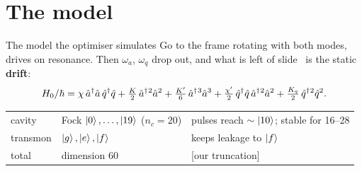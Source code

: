 \section{The model}

\begin{frame}{The model the optimiser simulates}
  Go to the frame rotating with both modes, drives on resonance. Then $\omega_a$, $\omega_q$
  drop out, and what is left of slide~ is the static \textbf{drift}:
  \[
    H_0/\hbar = \chi\,\hat{a}^{\dagger}\hat{a}\,\hat{q}^{\dagger}\hat{q}
      + \tfrac{K}{2}\,\hat{a}^{\dagger}{}^{2}\hat{a}^{2} + \tfrac{K'}{6}\,\hat{a}^{\dagger}{}^{3}\hat{a}^{3}
      + \tfrac{\chi'}{2}\,\hat{q}^{\dagger}\hat{q}\,\hat{a}^{\dagger}{}^{2}\hat{a}^{2}
      + \tfrac{K_q}{2}\,\hat{q}^{\dagger}{}^{2}\hat{q}^{2} .
  \]
  \vspace{-0.6em}

  \medskip
  {\small
  \begin{tabular}{@{}l l l@{}}
    cavity   & Fock $\left|0\right\rangle,\dots,\left|19\right\rangle$ \;($n_c = 20$) & pulses reach $\sim\left|10\right\rangle$; stable for 16--28 \\
    transmon & $\left|g\right\rangle, \left|e\right\rangle, \left|f\right\rangle$                 & keeps leakage to $\left|f\right\rangle$ \\
    total    & dimension $60$                               & {\color{tagmid}\scriptsize [our truncation]}
  \end{tabular}}


\end{frame}
